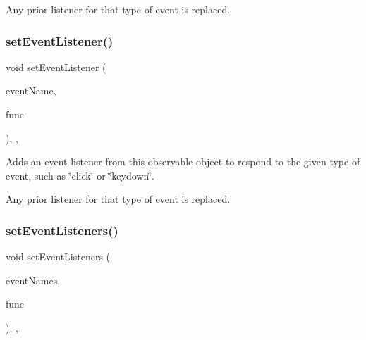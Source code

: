 Any prior listener for that type of event is replaced. \mbox{\label{classsgl_1_1GObservable_abac4cb9f9e626e010e87f5d91573c8a5}} 
\subsubsection{\texorpdfstring{set\+Event\+Listener()}{setEventListener()}\hspace{0.1cm}{\footnotesize\ttfamily [2/2]}}
{\footnotesize\ttfamily void set\+Event\+Listener (\begin{DoxyParamCaption}\item[{const std\+::string \&}]{event\+Name,  }\item[{\mbox{\hyperlink{namespacesgl_a54427ce97bb1c2804e4fe2b0a62e8b17}{G\+Event\+Listener\+Void}}}]{func }\end{DoxyParamCaption})\hspace{0.3cm}{\ttfamily [protected]}, {\ttfamily [virtual]}, {\ttfamily [inherited]}}



Adds an event listener from this observable object to respond to the given type of event, such as \char`\"{}click\char`\"{} or \char`\"{}keydown\char`\"{}. 

Any prior listener for that type of event is replaced. \mbox{\label{classsgl_1_1GObservable_afa388d69c33c718cf035774604065604}} 
\subsubsection{\texorpdfstring{set\+Event\+Listeners()}{setEventListeners()}\hspace{0.1cm}{\footnotesize\ttfamily [1/2]}}
{\footnotesize\ttfamily void set\+Event\+Listeners (\begin{DoxyParamCaption}\item[{std\+::initializer\+\_\+list$<$ std\+::string $>$}]{event\+Names,  }\item[{\mbox{\hyperlink{namespacesgl_ae9f3e9eab70035da1a2b114e21357b25}{G\+Event\+Listener}}}]{func }\end{DoxyParamCaption})\hspace{0.3cm}{\ttfamily [protected]}, {\ttfamily [virtual]}, {\ttfamily [inherited]}}



